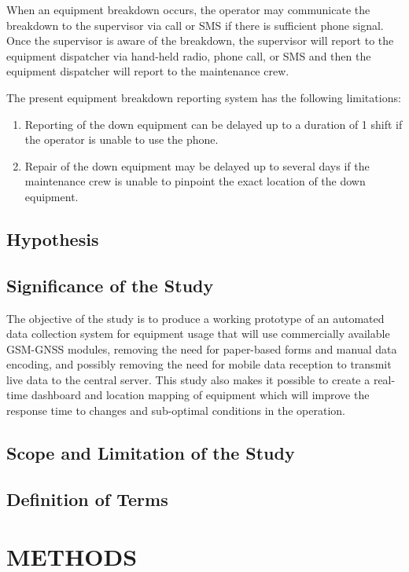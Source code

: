 \documentclass[12pt]{report}
\begin{document}
When an equipment breakdown occurs, the operator may communicate the breakdown to the supervisor via call or SMS if there is sufficient phone signal.
Once the supervisor is aware of the breakdown, the supervisor will report to the equipment dispatcher via hand-held radio, phone call, or SMS and then the equipment dispatcher will report to the maintenance crew.

The present equipment breakdown reporting system has the following limitations:

\begin{enumerate}
\item Reporting of the down equipment can be delayed up to a duration of 1 shift if the operator is unable to use the phone.
\item Repair of the down equipment may be delayed up to several days if the maintenance crew is unable to pinpoint the exact location of the down equipment.
\end{enumerate}

\section{Hypothesis}

\section{Significance of the Study}

The objective of the study is to produce a working prototype of an automated data collection system for equipment usage that will use commercially available GSM-GNSS modules, removing the need for paper-based forms and manual data encoding, and possibly removing the need for mobile data reception to transmit live data to the central server.
This study also makes it possible to create a real-time dashboard and location mapping of equipment which will improve the response time to changes and sub-optimal conditions in the operation.

\section{Scope and Limitation of the Study}

\section{Definition of Terms}

\chapter{METHODS}
\end{document}
